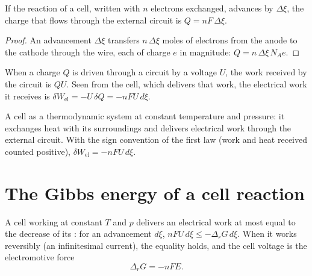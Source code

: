 \begin{proposition}\label{prop:b2:cell-thermodynamics:charge}
If the reaction of a cell, written with $n$ electrons exchanged, advances by
$\Delta\xi$, the charge that flows through the external circuit is $Q =
nF\,\Delta\xi$.
\end{proposition}

\begin{proof}
An advancement $\Delta\xi$ transfers $n\,\Delta\xi$ moles of electrons from
the anode to the cathode through the wire, each of charge $e$ in magnitude:
$Q = n\,\Delta\xi\,N_A e$.
\end{proof}

When a charge $Q$ is driven through a circuit by a voltage $U$, the work
received by the circuit is $QU$. Seen from the cell, which delivers that work,
the electrical work it receives is $\delta W_{\text{el}} = -U\,\delta Q = -nFU\,
d\xi$.

\begin{omfigure}

{\small A cell as a thermodynamic system at constant temperature and pressure:
it exchanges heat with its surroundings and delivers electrical work through
the external circuit. With the sign convention of the first law (work and heat
received counted positive), $\delta W_{\text{el}} = -nFU\,d\xi$.}
\end{omfigure}

\section{The Gibbs energy of a cell reaction}

\begin{theorem}\label{thm:b2:cell-thermodynamics:delta-g-nfe}
A cell working at constant $T$ and $p$ delivers an electrical work at most
equal to the decrease of its : for an advancement $d\xi$,
$nFU\,d\xi \leq -\Delta_r G\,d\xi$. When it works reversibly (an
infinitesimal current), the equality holds, and the cell voltage is the
electromotive force
\[
  \Delta_r G = -nFE .
\]
\end{theorem}

